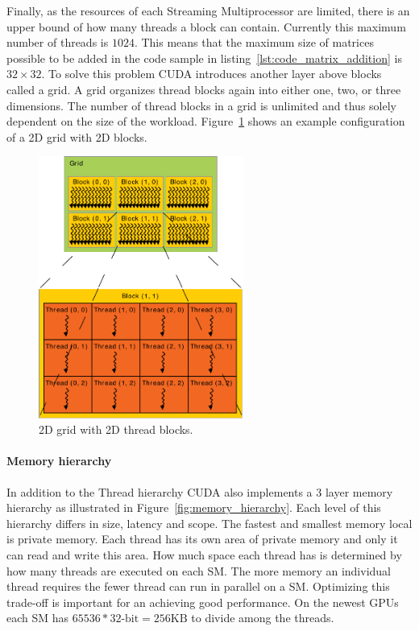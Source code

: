 \documentclass[a4paper,11pt]{kth-mag}
\begin{document}
Finally, as the resources of each Streaming Multiprocessor are limited, there is an upper bound of how many threads a block can contain. Currently this maximum number of threads is $1024$. This means that the maximum size of matrices possible to be added in the code sample in listing~\ref{lst:code_matrix_addition} is $32\times32$. To solve this problem CUDA introduces another layer above blocks called a grid. A grid organizes thread blocks again into either one, two, or three dimensions. The number of thread blocks in a grid is unlimited and thus solely dependent on the size of the workload. Figure~\ref{fig:grid_blocks} shows an example configuration of a 2D grid with 2D blocks.

\begin{figure}[!htbp]
  \centering
  \includegraphics[width=0.6\textwidth]{img/grid_blocks.pdf}
  \caption{2D grid with 2D thread blocks.}
  \label{fig:grid_blocks}
\end{figure}

\paragraph{Memory hierarchy}

In addition to the Thread hierarchy CUDA also implements a 3 layer memory hierarchy as illustrated in Figure~\ref{fig:memory_hierarchy}. Each level of this hierarchy differs in size, latency and scope. The fastest and smallest memory local is private memory. Each thread has its own area of private memory and only it can read and write this area. How much space each thread has is determined by how many threads are executed on each SM. The more memory an individual thread requires the fewer thread can run in parallel on a SM. Optimizing this trade-off is important for an achieving good performance. On the newest GPUs each SM has $65536 * 32\text{-bit} = 256\text{KB}$ to divide among the threads.
\end{document}
